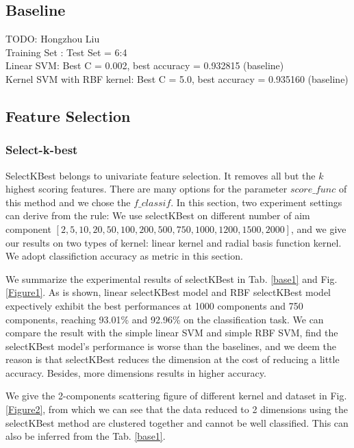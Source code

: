 \documentclass{article}
\begin{document}
\subsection{Baseline}
TODO: Hongzhou Liu\\
Training Set : Test Set = 6:4 \\
Linear SVM: Best C = 0.002, best accuracy = 0.932815 (baseline) \\
Kernel SVM with RBF kernel: Best C = 5.0, best accuracy = 0.935160 (baseline) \\
\subsection{Feature Selection}
\subsubsection{Select-k-best}
SelectKBest belongs to univariate feature selection. It removes all but the $k$ highest scoring features. There are many options for the parameter $score\_func$ of this method and we chose the $f\_classif$. In this section, two experiment settings can derive from the rule: We use selectKBest on different number of aim component $[2, 5, 10, 20, 50, 100, 200, 500, 750, 1000, 1200, 1500, 2000]$, and we give our results on two types of kernel: linear kernel and radial basis function kernel. We adopt classifiction accuracy as metric in this section.

We summarize the experimental results of selectKBest in Tab. \ref{base1} and Fig. \ref{Figure1}. As is shown, linear selectKBest model and RBF selectKBest model expectively exhibit the best performances at 1000 components and 750 components, reaching 93.01\% and 92.96\% on the classification task. We can compare the result with the simple linear SVM and simple RBF SVM, find the selectKBest model's performance is worse than the baselines, and we deem the reason is that selectKBest reduces the dimension at the cost of reducing a little accuracy. Besides, more dimensions results in higher accuracy.

We give the 2-components scattering figure of different kernel and dataset in Fig. \ref{Figure2}, from which we can see that the data reduced to 2 dimensions using the selectKBest method are clustered together and cannot be well classified. This can also be inferred from the Tab. \ref{base1}.
\end{document}
